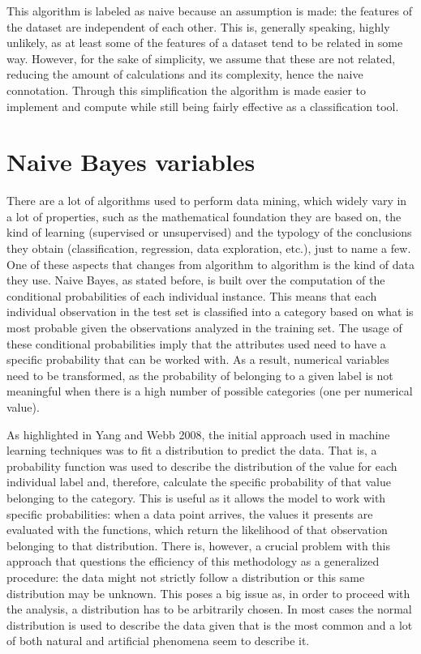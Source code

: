 \documentclass{article}
\begin{document}
This algorithm is labeled as naive because an assumption is made: the features of the dataset are independent of each other. This is, generally speaking, highly unlikely, as at least some of the features of a dataset tend to be related in some way. However, for the sake of simplicity, we assume that these are not related, reducing the amount of calculations and its complexity, hence the naive connotation. Through this simplification the algorithm is made easier to implement and compute while still being fairly effective as a classification tool.

\section{Naive Bayes variables}

There are a lot of algorithms used to perform data mining, which widely vary in a lot of properties, such as the mathematical foundation they are based on, the kind of learning (supervised or unsupervised) and the typology of the conclusions they obtain (classification, regression, data exploration, etc.), just to name a few. One of these aspects that changes from algorithm to algorithm is the kind of data they use. Naive Bayes, as stated before, is built over the computation of the conditional probabilities of each individual instance. This means that each individual observation in the test set is classified into a category based on what is most probable given the observations analyzed in the training set. The usage of these conditional probabilities imply that the attributes used need to have a specific probability that can be worked with. As a result, numerical variables need to be transformed, as the probability of belonging to a given label is not meaningful when there is a high number of possible categories (one per numerical value).

As highlighted in Yang and Webb 2008\cite{yang08}, the initial approach used in machine learning techniques was to fit a distribution to predict the data. That is, a probability function was used to describe the distribution of the value for each individual label and, therefore, calculate the specific probability of that value belonging to the category. This is useful as it allows the model to work with specific probabilities: when a data point arrives, the values it presents are evaluated with the functions, which return the likelihood of that observation belonging to that distribution. There is, however, a crucial problem with this approach that questions the efficiency of this methodology as a generalized procedure: the data might not strictly follow a distribution or this same distribution may be unknown. This poses a big issue as, in order to proceed with the analysis, a distribution has to be arbitrarily chosen. In most cases the normal distribution is used to describe the data given that is the most common and a lot of both natural and artificial phenomena seem to describe it. 
\end{document}
